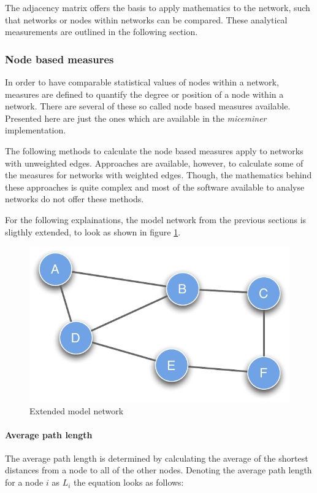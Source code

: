 The adjacency matrix offers the basis to apply mathematics to the network, such that networks or nodes within networks can be compared. These analytical measurements are outlined in the following section.

\subsubsection{Node based measures}
\label{subsubsec:node_based}

In order to have comparable statistical values of nodes within a network, measures are defined to quantify the degree or position of a node within a network. There are several of these so called node based measures available. Presented here are just the ones which are available in the \textit{miceminer} implementation.

The following methods to calculate the node based measures apply to networks with unweighted edges. Approaches are available, however, to calculate some of the measures for networks with weighted edges. Though, the mathematics behind these approaches is quite complex and most of the software available to analyse networks do not offer these methods.

For the following explainations, the model network from the previous sections is sligthly extended, to look as shown in figure \ref{fig:extended_network}.

\begin{figure}[!htpb]
\begin{center}
  \includegraphics[width=.45\textwidth]{assets/pdf/graph_undirected_node_based.pdf}
  \caption{Extended model network}
  \label{fig:extended_network}
\end{center}
\end{figure}    

\paragraph{Average path length}

The average path length is determined by calculating the average of the shortest distances from a node to all of the other nodes. Denoting the average path length for a node $i$ as $L_i$ the equation looks as follows:

